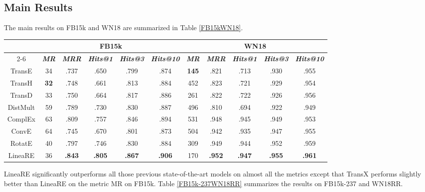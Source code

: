 \documentclass[conference]{IEEEtran}
\begin{document}
\subsection{Main Results}
The main results on FB15k and WN18 are summarized in Table \ref{FB15kWN18}.
\begin{table*}[t]
	\caption{
		Link prediction results on FB15k and WN18.
	}
	\label{FB15kWN18}
	\begin{center}
		\begin{tabular}{|c||c|c|c|c|c||c|c|c|c|c|}
			\hline
			\multirow{2}{*}{}
			& \multicolumn{5}{c||}{\textbf{FB15k}}
			& \multicolumn{5}{c|}{\textbf{WN18}}   \\
			\cline{2-6} \cline{7-11}
			& \textbf{\textit{MR}}  & \textbf{\textit{MRR}}	 & \textbf{\textit{Hits@1}}  & \textbf{\textit{Hits@3}}  & \textbf{\textit{Hits@10}}
			& \textbf{\textit{MR}}  & \textbf{\textit{MRR}}  & \textbf{\textit{Hits@1}}  & \textbf{\textit{Hits@3}}  & \textbf{\textit{Hits@10}} \\
			\hline
			TransE \cite{TransE}
			& 34			& .737	& .650	& .799	& .874
			& \textbf{145}	& .821	& .713	& .930	& .955  \\
			TransH \cite{TransH}
			& \textbf{32}	& .748	& .661	& .813	& .884
			& 452			& .823	& .721	& .929	& .954  \\
			TransD \cite{TransD}
			& 33	& .750	& .664	& .817	& .886
			& 261	& .822	& .722	& .926	& .956  \\
			DistMult \cite{DistMult}
			& 59	& .789	& .730	& .830	& .887
			& 496	& .810	& .694	& .922	& .949  \\
			ComplEx \cite{ComplEx}
			& 63	& .809	& .757	& .846	& .894
			& 531	& .948	& .945	& .949	& .953  \\
			ConvE \cite{ConvE}
			& 64	& .745	& .670	& .801	& .873
			& 504	& .942	& .935	& .947	& .955  \\
			RotatE \cite{RotatE}
			& 40	& .797	& .746	& .830	& .884
			& 309	& .949	& .944	& .952	& .959  \\
			\hline
			LineaRE
			& 36	& \textbf{.843}	& \textbf{.805}	& \textbf{.867}	& \textbf{.906}
			& 170	& \textbf{.952}	& \textbf{.947}	& \textbf{.955}	& \textbf{.961}  \\
			\hline
		\end{tabular}
	\end{center}
\end{table*}
LineaRE significantly outperforms all those previous state-of-the-art models on almost all the metrics except that TransX performs slightly better than LineaRE on the metric MR on FB15k. Table \ref{FB15k-237WN18RR} summarizes the results on FB15k-237 and WN18RR.
\end{document}
